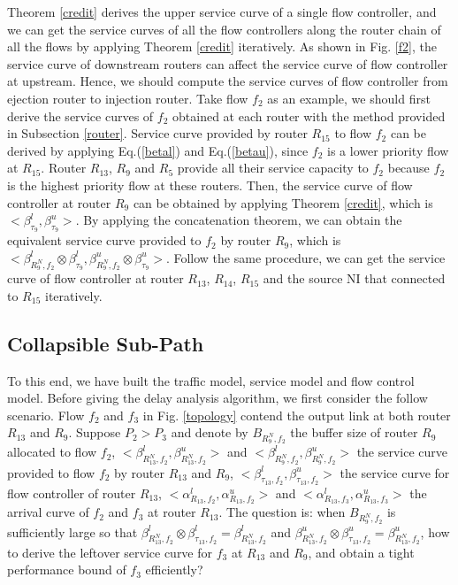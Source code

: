 \documentclass[10pt,journal]{IEEEtran}
\begin{document}
Theorem \ref{credit} derives the upper service curve of a single flow controller, and we can get the service curves of all the flow controllers along the router chain of all the flows by applying Theorem \ref{credit} iteratively. As shown in Fig. \ref{f2}, the service curve of downstream routers can affect the service curve of flow controller at upstream. Hence, we should compute the service curves of flow controller from ejection router to injection router. Take flow $f_2$ as an example, we should first derive the service curves of $f_2$ obtained at each router with the method provided in Subsection \ref{router}. Service curve provided by router $R_{15}$ to flow $f_2$ can be derived by applying Eq.(\ref{betal}) and Eq.(\ref{betau}), since $f_2$ is a lower priority flow at $R_{15}$. Router $R_{13}$, $R_{9}$ and $R_{5}$ provide all their service capacity to $f_2$ because $f_2$ is the highest priority flow at these routers. Then, the service curve of flow controller at router $R_{9}$ can be obtained by applying Theorem \ref{credit}, which is $<\beta_{\tau_9}^l,\beta_{\tau_9}^u>$. By applying the concatenation theorem, we can obtain the equivalent service curve provided to $f_2$ by router $R_{9}$, which is $<\beta_{R_9^N,f_2}^l\otimes\beta_{\tau_9}^l,\beta_{R_9^N,f_2}^u\otimes\beta_{\tau_9}^u>$. Follow the same procedure, we can get the service curve of flow controller at router $R_{13}$, $R_{14}$, $R_{15}$ and the source NI that connected to $R_{15}$ iteratively.

\subsection{Collapsible Sub-Path}\label{csp}
To this end, we have built the traffic model, service model and flow control model. Before giving the delay analysis algorithm, we first consider the follow scenario. Flow $f_2$ and $f_3$ in Fig. \ref{topology} contend the output link at both router $R_{13}$ and $R_{9}$. Suppose $P_2>P_3$ and denote by $B_{R_9^N,f_2}$ the buffer size of router $R_{9}$ allocated to flow $f_2$, $<\beta_{R_{13}^N,f_2}^l,\beta_{R_{13}^N,f_2}^u>$ and $<\beta_{R_{9}^N,f_2}^l,\beta_{R_{9}^N,f_2}^u>$ the service curve provided to flow $f_2$ by router $R_{13}$ and $R_{9}$, $<\beta_{\tau_{13},f_2}^l,\beta_{\tau_{13},f_2}^u>$ the service curve for flow controller of router $R_{13}$, $<\alpha_{R_{13},f_2}^l,\alpha_{R_{13},f_2}^u>$ and $<\alpha_{R_{13},f_3}^l,\alpha_{R_{13},f_3}^u>$ the arrival curve of $f_2$ and $f_3$ at router $R_{13}$. The question is: when $B_{R_9^N,f_2}$ is sufficiently large so that $\beta_{R_{13}^N,f_2}^l\otimes\beta_{\tau_{13},f_2}^l=\beta_{R_{13}^N,f_2}^l$ and $\beta_{R_{13}^N,f_2}^u\otimes\beta_{\tau_{13},f_2}^u=\beta_{R_{13}^N,f_2}^u$, how to derive the leftover service curve for $f_3$ at $R_{13}$ and $R_9$, and obtain a tight performance bound of $f_3$ efficiently?
\end{document}

